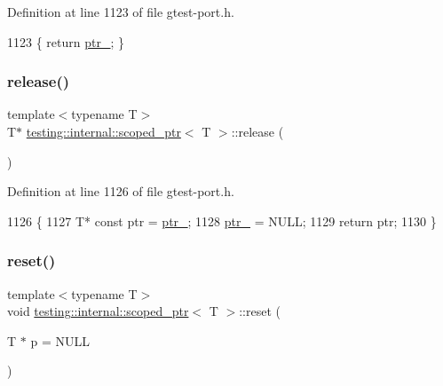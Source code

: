 Definition at line 1123 of file gtest-\/port.\+h.


\begin{DoxyCode}
1123 \{ \textcolor{keywordflow}{return} \hyperlink{classtesting_1_1internal_1_1scoped__ptr_ab69d9f1f216ae91f8b8abca63e797397}{ptr\_}; \}
\end{DoxyCode}
\mbox{\label{classtesting_1_1internal_1_1scoped__ptr_a7a4f3e568d81a5d8bcb5f8d6bf5130b1}} 
\subsubsection{\texorpdfstring{release()}{release()}}
{\footnotesize\ttfamily template$<$typename T$>$ \\
T$\ast$ \hyperlink{classtesting_1_1internal_1_1scoped__ptr}{testing\+::internal\+::scoped\+\_\+ptr}$<$ T $>$\+::release (\begin{DoxyParamCaption}{ }\end{DoxyParamCaption})\hspace{0.3cm}{\ttfamily [inline]}}



Definition at line 1126 of file gtest-\/port.\+h.


\begin{DoxyCode}
1126                \{
1127     T* \textcolor{keyword}{const} ptr = \hyperlink{classtesting_1_1internal_1_1scoped__ptr_ab69d9f1f216ae91f8b8abca63e797397}{ptr\_};
1128     \hyperlink{classtesting_1_1internal_1_1scoped__ptr_ab69d9f1f216ae91f8b8abca63e797397}{ptr\_} = NULL;
1129     \textcolor{keywordflow}{return} ptr;
1130   \}
\end{DoxyCode}
\mbox{\label{classtesting_1_1internal_1_1scoped__ptr_acac03266a43359801aff0de5c990bec0}} 
\subsubsection{\texorpdfstring{reset()}{reset()}}
{\footnotesize\ttfamily template$<$typename T$>$ \\
void \hyperlink{classtesting_1_1internal_1_1scoped__ptr}{testing\+::internal\+::scoped\+\_\+ptr}$<$ T $>$\+::reset (\begin{DoxyParamCaption}\item[{T $\ast$}]{p = {\ttfamily NULL} }\end{DoxyParamCaption})\hspace{0.3cm}{\ttfamily [inline]}}



